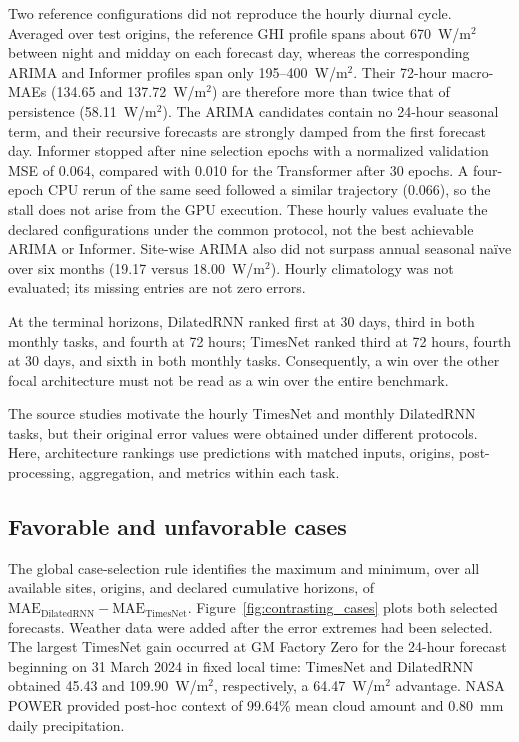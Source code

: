 Two reference configurations did not reproduce the hourly diurnal cycle.
Averaged over test origins, the reference GHI profile spans about
670~W/m$^2$ between night and midday on each forecast day, whereas the
corresponding ARIMA and Informer profiles span only 195--400~W/m$^2$.
Their 72-hour macro-MAEs (134.65 and 137.72~W/m$^2$) are therefore more than
twice that of persistence (58.11~W/m$^2$). The ARIMA candidates contain no
24-hour seasonal term, and their recursive forecasts are strongly damped
from the first forecast day. Informer stopped after nine selection epochs
with a normalized validation MSE of 0.064, compared with 0.010 for the
Transformer after 30 epochs. A four-epoch CPU rerun of the same seed
followed a similar trajectory (0.066), so the stall does not arise from the
GPU execution. These hourly values evaluate the declared
configurations under the common protocol, not the best achievable ARIMA or
Informer. Site-wise ARIMA also did not surpass annual seasonal na\"ive over
six months (19.17 versus 18.00~W/m$^2$). Hourly climatology was not
evaluated; its missing entries are not zero errors.

At the terminal horizons, DilatedRNN ranked first at 30 days, third in both
monthly tasks, and fourth at 72 hours; TimesNet ranked third at 72 hours,
fourth at 30 days, and sixth in both monthly tasks. Consequently, a win over
the other focal architecture must not be read as a win over the entire
benchmark.

The source studies motivate the hourly TimesNet and monthly DilatedRNN
tasks, but their original error values were obtained under different
protocols. Here, architecture rankings use predictions with matched inputs,
origins, post-processing, aggregation, and metrics within each task.

\subsection{Favorable and unfavorable cases}

The global case-selection rule identifies the maximum and minimum, over all
available sites, origins, and declared cumulative horizons, of
$\mathrm{MAE}_{\mathrm{DilatedRNN}}-\mathrm{MAE}_{\mathrm{TimesNet}}$.
Figure~\ref{fig:contrasting_cases} plots both selected forecasts.
Weather data were added after the error extremes had been selected. The
largest TimesNet gain occurred at GM Factory Zero for the 24-hour forecast beginning on
31 March 2024 in fixed local time: TimesNet and DilatedRNN obtained
45.43 and 109.90~W/m$^2$, respectively, a 64.47~W/m$^2$ advantage.
NASA POWER provided post-hoc context of 99.64\% mean cloud amount and
0.80~mm daily precipitation.

